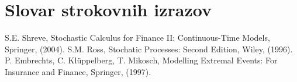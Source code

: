 \documentclass[12pt, a4paper, reqno]{amsart}
\theoremstyle{definition} %
\theoremstyle{plain} %
\newcommand{\geslo}[2]{\noindent\textbf{#1}\hspace*{3mm}\hangindent=\parindent\hangafter=1 #2}
\newcommand{\1}{\mathds{1}}
\begin{document}
\section*{Slovar strokovnih izrazov}

%
%


\begin{thebibliography}{99}

S.E. Shreve, Stochastic Calculus for Finance II: Continuous-Time Models, Springer, (2004).
S.M. Ross, Stochatic Processes: Second Edition, Wiley, (1996).
P. Embrechts, C. Klüppelberg, T. Mikosch, Modelling Extremal Events: For Insurance and Finance, Springer, (1997).
\end{thebibliography}
\end{document}
